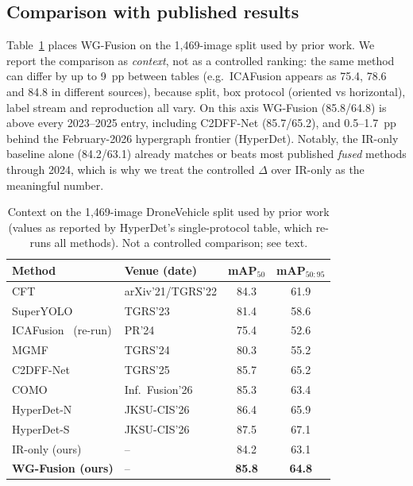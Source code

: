 \documentclass[10pt,twocolumn,letterpaper]{article}
\begin{document}
\subsection{Comparison with published results}
Table~\ref{tab:sota} places WG-Fusion on the 1,469-image split used by prior
work. We report the comparison as \emph{context}, not as a controlled ranking:
the same method can differ by up to 9~pp between tables (e.g.\ ICAFusion
appears as 75.4, 78.6 and 84.8 in different sources), because split, box
protocol (oriented vs horizontal), label stream and reproduction all vary. On
this axis WG-Fusion (85.8/64.8) is above every 2023--2025 entry, including
C2DFF-Net (85.7/65.2), and 0.5--1.7~pp behind the February-2026 hypergraph
frontier (HyperDet). Notably, the IR-only baseline alone (84.2/63.1) already
matches or beats most published \emph{fused} methods through 2024, which is why
we treat the controlled $\Delta$ over IR-only as the meaningful number.

\begin{table}[t]
\centering
\small
\setlength{\tabcolsep}{4pt}
\begin{tabular}{@{}llcc@{}}
\toprule
Method & Venue (date) & mAP$_{50}$ & mAP$_{50{:}95}$ \\
\midrule
CFT~\cite{cft} & arXiv'21/TGRS'22 & 84.3 & 61.9 \\
SuperYOLO~\cite{superyolo} & TGRS'23 & 81.4 & 58.6 \\
ICAFusion~\cite{icafusion} (re-run) & PR'24 & 75.4 & 52.6 \\
MGMF~\cite{mgmf} & TGRS'24 & 80.3 & 55.2 \\
C2DFF-Net~\cite{c2dff} & TGRS'25 & 85.7 & 65.2 \\
COMO~\cite{como} & Inf.\ Fusion'26 & 85.3 & 63.4 \\
HyperDet-N~\cite{hyperdet} & JKSU-CIS'26 & 86.4 & 65.9 \\
HyperDet-S~\cite{hyperdet} & JKSU-CIS'26 & 87.5 & 67.1 \\
\midrule
IR-only (ours) & -- & 84.2 & 63.1 \\
\textbf{WG-Fusion (ours)} & -- & \textbf{85.8} & \textbf{64.8} \\
\bottomrule
\end{tabular}
\caption{Context on the 1,469-image DroneVehicle split used by prior work
(values as reported by HyperDet's single-protocol table, which re-runs all
methods). Not a controlled comparison; see text.}
\label{tab:sota}
\end{table}
\end{document}
